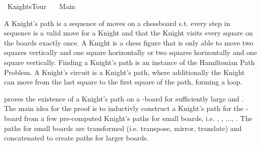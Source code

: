 %
\begin{isabellebody}%
%
%
\isadelimtheory
\isanewline
\isanewline
%
\endisadelimtheory
%
\isatagtheory
{}\isamarkupfalse%
\ KnightsTour\isanewline
\ \ \ Main\isanewline
{}%
\endisatagtheory
{\isafoldtheory}%
%
\isadelimtheory
%
\endisadelimtheory
%
\isadelimdocument
%
\endisadelimdocument
%
\isatagdocument
%
\isamarkuptrue%
%
\endisatagdocument
{\isafolddocument}%
%
\isadelimdocument
%
\endisadelimdocument
%
\begin{isamarkuptext}%
A Knight's path is a sequence of moves on a chessboard s.t. every step in sequence is a 
valid move for a Knight and that the Knight visits every square on the boards exactly once. 
A Knight is a chess figure that is only able to move two squares vertically and one square 
horizontally or two squares horizontally and one square vertically. Finding a Knight's path is an 
instance of the Hamiltonian Path Problem. A Knight's circuit is a Knight's path, where additionally 
the Knight can move from the last square to the first square of the path, forming a loop.

\cite{cull_decurtins_1987} proves the existence of a Knight's path on a -board for
sufficiently large  and . The main idea for the proof is to inductivly construct a Knight's 
path for the -board from a few pre-computed Knight's paths for small boards, i.e. , 
, ..., . The paths for small boards are transformed (i.e. transpose, mirror, translate) 
and concatenated to create paths for larger boards.


\end{isamarkuptext}
\end{isabellebody}
